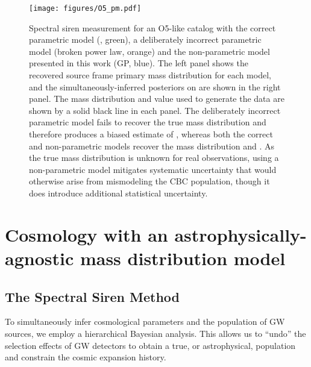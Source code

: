 \documentclass[]{aastex631}
\begin{document}
\begin{figure*}
    \centering
    \texttt{[image: figures/O5\_pm.pdf]}
    \caption{Spectral siren measurement for an \ac{O5}-like catalog with the correct parametric model (\plp, green), a deliberately incorrect parametric model (broken power law, orange) and the non-parametric model presented in this work (\acl{GP}, blue).
    The left panel shows the recovered source frame primary mass distribution for each model, and the simultaneously-inferred posteriors on \Ho{} are shown in the right panel.
    The mass distribution and \Ho{} value used to generate the data are shown by a solid black line in each panel. 
    The deliberately incorrect parametric model fails to recover the true mass distribution and therefore produces a biased estimate of \Ho{}, whereas both the correct and non-parametric models recover  the mass distribution and \Ho{}.
    As the true mass distribution is unknown for real observations, using a non-parametric model mitigates systematic uncertainty that would otherwise arise from mismodeling the \ac{CBC} population, though it does introduce additional statistical uncertainty.
    }
    \label{fig:O5_GP}
\end{figure*}

\section{Cosmology with an astrophysically-agnostic mass distribution model}
\label{sec:methods}
\subsection{The Spectral Siren Method}
\label{sec:ss}
To simultaneously infer cosmological parameters and the population of GW sources, we employ a hierarchical Bayesian analysis.
This allows us to ``undo'' the selection effects of \ac{GW} detectors to obtain a true, or astrophysical, population and constrain the cosmic expansion history.
\end{document}
